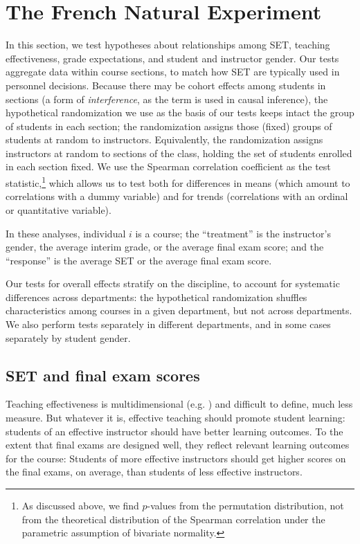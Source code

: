 \documentclass[12pt]{article}
\begin{document}
\section{The French Natural Experiment}
In this section, we test hypotheses about relationships among
SET, teaching effectiveness, grade expectations, and student and instructor gender.
Our tests aggregate data within course sections, to match how SET are typically
used in personnel decisions. 
Because there may be cohort effects among students in sections (a form of
\emph{interference}, as the term is used in causal inference), the hypothetical randomization we
use as the basis of our tests keeps intact the group of students in each section;
the randomization assigns those (fixed) groups of students at random to instructors.
Equivalently, the randomization assigns instructors at random to sections of the class,
holding the set of students enrolled in each section fixed.
We use the Spearman correlation coefficient as the test statistic,\footnote{%
As discussed above, we find $p$-values from the permutation distribution, not from
the theoretical distribution of the Spearman correlation 
under the parametric assumption of bivariate normality.
} 
which allows us to test both for 
differences in means (which amount to correlations with a dummy variable) and for 
trends (correlations with an ordinal or quantitative variable).

In these analyses, individual $i$ is a course; the ``treatment'' is the instructor's gender, 
the average interim grade, or the average final exam score;
and the ``response'' is the average SET or the average final exam score.

Our tests for overall effects stratify on the discipline, to account for systematic
differences across departments:
the hypothetical randomization shuffles characteristics among courses in a given
department, but not across departments.
We also perform tests separately in different departments, and in some cases separately by
student gender.

\subsection{SET and final exam scores}
Teaching effectiveness is multidimensional (e.g. \citet{Marsh1997}) and difficult to define,
much less measure. 
But whatever it is, effective teaching should promote student learning:
students of an effective instructor should have better learning outcomes. 
To the extent that final exams are designed well, they reflect relevant learning outcomes for
the course:
Students of more effective instructors should get higher scores on the final exams, on average,
than students of less effective instructors.
\end{document}
